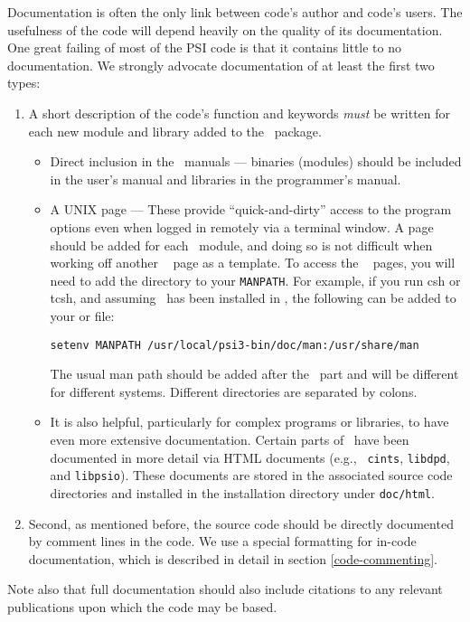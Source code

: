 Documentation is often the only link between code's author and code's
users. The usefulness of the code will depend heavily on the quality
of its documentation.  One great failing of most of the PSI code is
that it contains little to no documentation.  We strongly advocate
documentation of at least the first two types:
\begin{enumerate}
\item A short description of the code's function and keywords {\em must} be 
written for each new module and library added to the \PSIthree\ package.
\begin{itemize}
\item Direct inclusion in the \PSIthree\ manuals --- binaries
(modules) should be included in the user's manual and libraries in the
programmer's manual.
\item A UNIX  page --- These provide ``quick-and-dirty'' access
to the program options even when logged in remotely via a terminal window.
A  page should be added for each \PSIthree\ module, and doing so 
is not difficult when working off another \PSIthree\  page as a
template.  To access the 
\PSIthree\  pages, you will need to add the  directory
to your {\tt MANPATH}.  For example, if you run csh or tcsh, and
assuming \PSIthree\ has been installed in ,
the following can be added to your  or  file:
\begin{verbatim}
setenv MANPATH /usr/local/psi3-bin/doc/man:/usr/share/man
\end{verbatim}
The usual man path should be added after the \PSIthree\ part and
will be different for different systems.  Different directories are
separated by colons.
\item It is also helpful, particularly for complex programs or libraries,
to have even more extensive documentation.  Certain parts of \PSIthree\
have been documented in more detail via HTML documents (e.g., {\tt
cints}, {\tt libdpd}, and {\tt libpsio}).  These documents are stored
in the associated source code directories and installed in the installation 
directory under {\tt doc/html}.
\end{itemize}

\item Second, as mentioned before, the source code should be directly
documented by comment lines in the code.  We use a special formatting
for in-code documentation, which is described in detail in section
\ref{code-commenting}.

\end{enumerate}

Note also that full documentation should also include citations to any
relevant publications upon which the code may be based.

